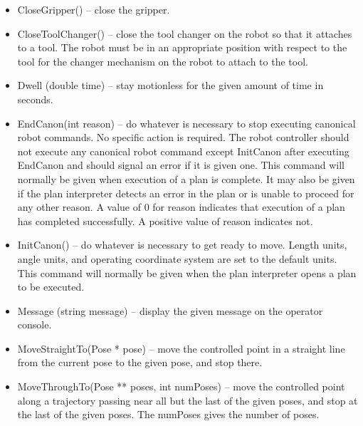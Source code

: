 \begin{itemize}

\item \sf CloseGripper() \rm -- close the gripper.\\

\item \sf CloseToolChanger() \rm -- close the tool changer on the robot so
  that it attaches to a tool. The robot must be in an appropriate position
  with respect to the tool for the changer mechanism on the robot to attach
  to the tool.\\

\item \sf Dwell (double time) \rm -- stay motionless for the given amount
  of \sf time \rm in seconds.\\

\item \sf EndCanon(int reason) \rm -- do whatever is necessary to stop
  executing canonical robot commands. No specific action is required. The
  robot controller should not execute any canonical robot command except
  \sf InitCanon \rm after executing \sf EndCanon \rm and should signal an
  error if it is given one.  This command will normally be given when
  execution of a plan is complete.  It may also be given if the plan
  interpreter detects an error in the plan or is unable to proceed for any
  other reason. A value of 0 for \sf reason \rm indicates that execution of
  a plan has completed successfully.  A positive value of reason indicates
  not.\\

\item \sf InitCanon() \rm -- do whatever is necessary to get ready to
move. Length units, angle units, and operating coordinate system are 
set to the default units. This command
will normally be given when the plan interpreter opens a plan to be
executed.\\

\item \sf Message (string message) \rm -- display the given \sf message \rm
  on the operator console.\\

\item \sf MoveStraightTo(Pose * pose) \rm -- move the controlled point in a
  straight line from the current pose to the given \sf pose\rm, and stop
  there.\\

\item \sf MoveThroughTo(Pose ** poses, int numPoses) \rm -- move the
  controlled point along a trajectory passing near all but the last of the
  given \sf poses\rm, and stop at the last of the given \sf poses\rm.
  The \sf numPoses \rm gives the number of poses.\\


\end{itemize}

